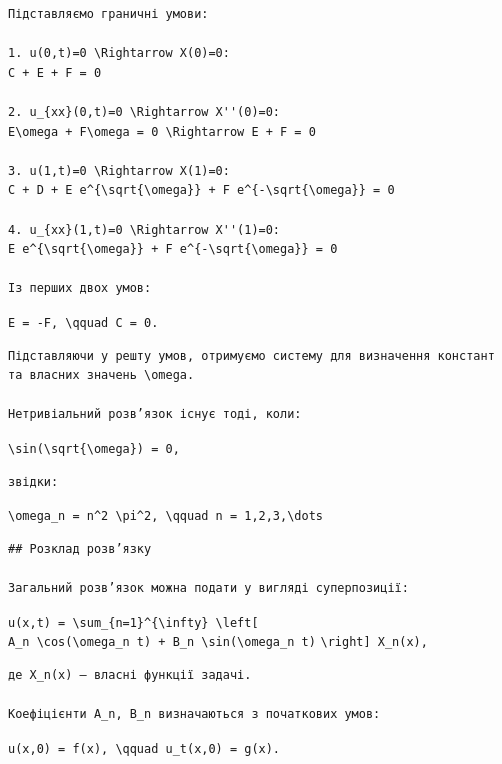 \documentclass[
  ukrainian,
]{article}
\begin{document}
\begin{verbatim}
Підставляємо граничні умови:

1. u(0,t)=0 \Rightarrow X(0)=0:
C + E + F = 0

2. u_{xx}(0,t)=0 \Rightarrow X''(0)=0:
E\omega + F\omega = 0 \Rightarrow E + F = 0

3. u(1,t)=0 \Rightarrow X(1)=0:
C + D + E e^{\sqrt{\omega}} + F e^{-\sqrt{\omega}} = 0

4. u_{xx}(1,t)=0 \Rightarrow X''(1)=0:
E e^{\sqrt{\omega}} + F e^{-\sqrt{\omega}} = 0

Із перших двох умов:
\end{verbatim}

\texttt{E\ =\ -F,\ \textbackslash{}qquad\ C\ =\ 0.}

\begin{verbatim}
Підставляючи у решту умов, отримуємо систему для визначення констант та власних значень \omega.

Нетривіальний розв’язок існує тоді, коли:
\end{verbatim}

\texttt{\textbackslash{}sin(\textbackslash{}sqrt\{\textbackslash{}omega\})\ =\ 0,}

\begin{verbatim}
звідки:
\end{verbatim}

\texttt{\textbackslash{}omega\_n\ =\ n\^{}2\ \textbackslash{}pi\^{}2,\ \textbackslash{}qquad\ n\ =\ 1,2,3,\textbackslash{}dots}

\begin{verbatim}
## Розклад розв’язку

Загальний розв’язок можна подати у вигляді суперпозиції:
\end{verbatim}

\texttt{u(x,t)\ =\ \textbackslash{}sum\_\{n=1\}\^{}\{\textbackslash{}infty\}\ \textbackslash{}left{[}}
\texttt{A\_n\ \textbackslash{}cos(\textbackslash{}omega\_n\ t)\ +\ B\_n\ \textbackslash{}sin(\textbackslash{}omega\_n\ t)}
\texttt{\textbackslash{}right{]}\ X\_n(x),}

\begin{verbatim}
де X_n(x) — власні функції задачі.

Коефіцієнти A_n, B_n визначаються з початкових умов:
\end{verbatim}

\texttt{u(x,0)\ =\ f(x),\ \textbackslash{}qquad\ u\_t(x,0)\ =\ g(x).}
\end{document}

